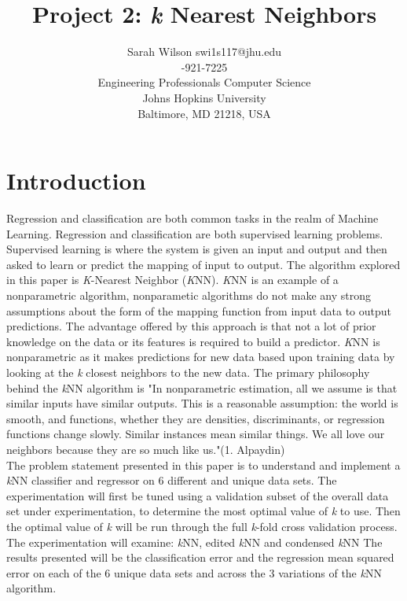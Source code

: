 \documentclass[twoside,11pt]{article}
\begin{document}
\title{Project 2: \textit{k} Nearest Neighbors}

\author{\name Sarah Wilson 
	   \email swi1s117@jhu.edu \\
	   -921-7225 \\
       \addr Engineering Professionals Computer Science\\
       Johns Hopkins University\\
       Baltimore, MD 21218, USA} 

\maketitle


\section{Introduction}
Regression and classification are both common tasks in the realm of Machine Learning. Regression and classification are both supervised learning problems. Supervised learning is where the system is given an input and output and then asked to learn or predict the mapping of input to output. The algorithm explored in this paper is \textit{K}-Nearest Neighbor (\textit{K}NN). \textit{K}NN is an example of a nonparametric algorithm, nonparametic algorithms do not make any strong assumptions about the form of the mapping function from input data to output predictions. The advantage offered by this approach is that not a lot of prior knowledge on the data or its features is required to build a predictor. \textit{K}NN is nonparametric as it makes predictions for new data based upon training data by looking at the \textit{k} closest neighbors to the new data. The primary philosophy behind the \textit{k}NN algorithm is "In nonparametric estimation, all we assume is that similar inputs have similar outputs. This is a reasonable assumption: the world is smooth, and functions, whether they are densities, discriminants, or regression functions change slowly. Similar instances mean similar things. We all love our neighbors because they are so much like us."(1. Alpaydin)\\ 

\hspace*{10mm} The problem statement presented in this paper is to understand and implement a \textit{k}NN classifier and regressor on 6 different and unique data sets. The experimentation will first be tuned using a validation subset of the overall data set under experimentation, to determine the most optimal value of \textit{k} to use. Then the optimal value of \textit{k} will be run through the full \textit{k}-fold cross validation process. The experimentation will examine: \textit{k}NN, edited \textit{k}NN and condensed \textit{k}NN The results presented will be the classification error and the regression mean squared error on each of the 6 unique data sets and across the 3 variations of the  \textit{k}NN algorithm.\\
\end{document}
